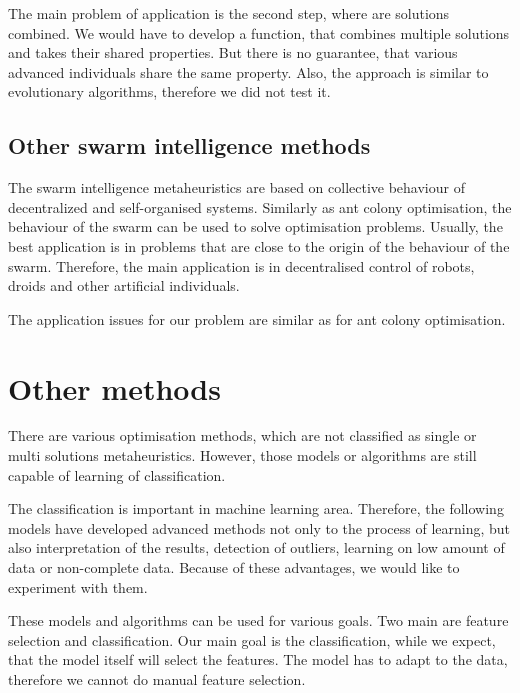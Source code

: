 \documentclass[
  print, %
  Table,   %
  nolof,     %
  nolot,     %
  11pt, %
  oneside  %
]{fithesis3}
\begin{document}
The main problem of application is the second step, where are solutions combined. We would have to develop a function, that combines multiple solutions and takes their shared properties. But there is no guarantee, that various advanced individuals share the same property. Also, the approach is similar to evolutionary algorithms, therefore we did not test it.

\subsection{Other swarm intelligence methods}
\label{subsec:opt-multi-sol-si}

The swarm intelligence metaheuristics are based on collective behaviour of decentralized and self-organised systems. Similarly as ant colony optimisation, the behaviour of the swarm can be used to solve optimisation problems. Usually, the best application is in problems that are close to the origin of the behaviour of the swarm. Therefore, the main application is in decentralised control of robots, droids and other artificial individuals.

The application issues for our problem are similar as for ant colony optimisation.

\section{Other methods}
\label{sec:opt-other}

There are various optimisation methods, which are not classified as single or multi solutions metaheuristics. However, those models or algorithms are still capable of learning of classification.

The classification is important in machine learning area. Therefore, the following models have developed advanced methods not only to the process of learning, but also interpretation of the results, detection of outliers, learning on low amount of data or non-complete data. Because of these advantages, we would like to experiment with them.

These models and algorithms can be used for various goals. Two main are feature selection and classification. Our main goal is the classification, while we expect, that the model itself will select the features. The model has to adapt to the data, therefore we cannot do manual feature selection.

% 
\end{document}
